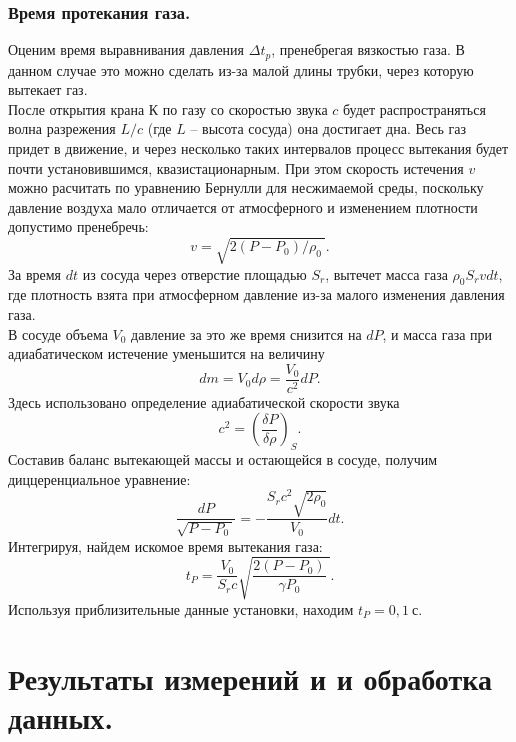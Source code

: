 \documentclass[a4paper,11pt]{article}
\begin{document}
\subsubsection{Время протекания газа.}
Оценим время выравнивания давления $\Delta t_{p}$, пренебрегая вязкостью газа. В данном случае это можно сделать из-за малой длины трубки, через которую вытекает газ.\\
После открытия крана К по газу со скоростью звука $c$ будет распространяться волна разрежения $L/c$ (где $L$ -- высота сосуда) она достигает дна. Весь газ придет в движение, и через несколько таких интервалов процесс вытекания будет почти установившимся, квазистационарным. При этом скорость истечения $v$ можно расчитать по уравнению Бернулли для несжимаемой среды, поскольку давление воздуха мало отличается от атмосферного и изменением плотности допустимо пренебречь:
$$v = \sqrt{2(P - P_{0})/\rho_{0}\ }.$$
За время $dt$ из сосуда через отверстие площадью $S_{r}$, вытечет масса газа $\rho_{0} S_{r}vdt$, где плотность взята при атмосферном давление из-за малого изменения давления газа.\\
В сосуде объема $V_{0}$ давление за это же время снизится на $dP$, и масса газа при адиабатическом истечение уменьшится на величину
$$dm = V_{0}d\rho = \frac{V_{0}}{c^{2}}dP.$$
Здесь использовано определение адиабатической скорости звука
$$c^{2} = \left(\frac{\delta P}{\delta \rho}\right)_{S}.$$
Составив баланс вытекающей массы и остающейся в сосуде, получим диццеренциальное уравнение:
$$\frac{dP}{\sqrt{P-P_{0}\ }} = - \frac{S_{r} c^{2}\sqrt{2 \rho_{0}}}{V_{0}}dt.$$
Интегрируя, найдем искомое время вытекания газа:
\begin{equation}    \label{eq6}
  t_{P} = \frac{V_{0}}{S_{r}c} \sqrt{\frac{2(P - P_{0})}{\gamma P_{0}}\ }.
\end{equation}
Используя приблизительные данные установки, находим $t_{P} = 0,1\ с$.
\section{Результаты измерений и и обработка данных.}
\end{document}
